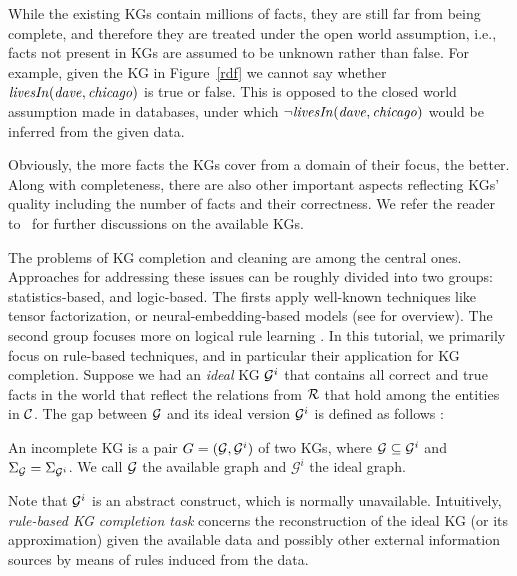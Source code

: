 While the existing KGs contain millions of facts, they are still far from being complete, and therefore they are treated under the open world assumption, i.e., facts not present in KGs are assumed to be unknown rather than false. For example, given the KG in Figure~\ref{rdf} we cannot say whether $\mathit{livesIn(dave,chicago)}$ is true or false. This is opposed to the closed world assumption made in databases, under which $\mathit{\neg livesIn(dave,chicago)}$ would be inferred from the given data.

Obviously, the more facts the KGs cover from a %
domain  of their focus, %
the better. Along with completeness, there are also other important aspects reflecting KGs' quality %
including the number of facts %
and %
their correctness.  We refer the reader to~\cite{Nickel2015ARO,DBLP:journals/semweb/Paulheim17} for further discussions on the available KGs.


The problems of KG completion and cleaning are %
among the central ones. Approaches for addressing these issues can be roughly divided into two groups: statistics-based, and logic-based. The firsts apply well-known techniques like tensor factorization, or neural-embedding-based models (see \cite{DBLP:journals/pieee/Nickel0TG16} for overview). The second group focuses more on logical rule learning \cite{ruleoverview}. In this tutorial, we primarily focus on rule-based techniques, and in particular their application for KG completion.
Suppose we had an \emph{ideal} KG $\mathcal{G}^i$ that contains all correct and true facts in the world that reflect the relations from $\mathcal{R}$ that hold among the entities in $\mathcal{C}$. The gap between $\mathcal{G}$ and its ideal version $\mathcal{G}^i$ is defined as follows \cite{rdfcomp}: 

\begin{definition} An incomplete KG is a pair
    $G = (\mathcal{G}, \mathcal{G}^i)$ of two KGs, where $\mathcal{G}\subseteq \mathcal{G}^i$ and
    $\Sigma_{\mathcal{G}}=\Sigma_{\mathcal{G}^i}$. We call $\mathcal{G}$ the available
    graph and $\mathcal{G}^i$ the ideal graph.  \end{definition}
    
Note that $\mathcal{G}^i$ is an abstract construct, which is normally unavailable. Intuitively, \emph{rule-based KG completion task} concerns the reconstruction of the ideal KG (or its approximation) given the available data and possibly other external information sources by means of rules induced from the data.

